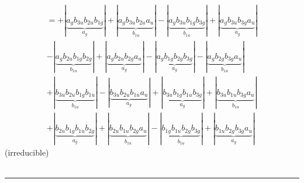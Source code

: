 \documentclass{article}
\begin{document}
\begin{multline*}
\end{multline*}\begin{multline*}
=+\left|\underbrace{a_{g} b_{3u} b_{2u} b_{1g}}_{a_{g}}\right|+\left|\underbrace{a_{g} b_{3u} b_{2u} a_{u}}_{b_{1u}}\right|-\left|\underbrace{a_{g} b_{3u} b_{1g} b_{3g}}_{b_{1u}}\right|+\left|\underbrace{a_{g} b_{3u} b_{3g} a_{u}}_{a_{g}}\right|\\
-\left|\underbrace{a_{g} b_{2u} b_{1g} b_{2g}}_{b_{1u}}\right|+\left|\underbrace{a_{g} b_{2u} b_{2g} a_{u}}_{a_{g}}\right|-\left|\underbrace{a_{g} b_{1g} b_{2g} b_{3g}}_{a_{g}}\right|-\left|\underbrace{a_{g} b_{2g} b_{3g} a_{u}}_{b_{1u}}\right|\\
+\left|\underbrace{b_{3u} b_{2u} b_{1g} b_{1u}}_{b_{1u}}\right|-\left|\underbrace{b_{3u} b_{2u} b_{1u} a_{u}}_{a_{g}}\right|+\left|\underbrace{b_{3u} b_{1g} b_{1u} b_{3g}}_{a_{g}}\right|+\left|\underbrace{b_{3u} b_{1u} b_{3g} a_{u}}_{b_{1u}}\right|\\
+\left|\underbrace{b_{2u} b_{1g} b_{1u} b_{2g}}_{a_{g}}\right|+\left|\underbrace{b_{2u} b_{1u} b_{2g} a_{u}}_{b_{1u}}\right|-\left|\underbrace{b_{1g} b_{1u} b_{2g} b_{3g}}_{b_{1u}}\right|+\left|\underbrace{b_{1u} b_{2g} b_{3g} a_{u}}_{a_{g}}\right|
\end{multline*}(irreducible)\\ \\
\hrule\newpage 
\end{document}
